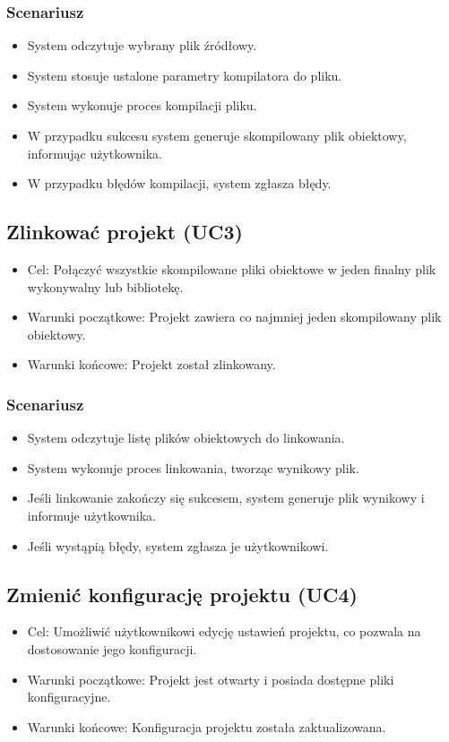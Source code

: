 \subsubsection{Scenariusz}
\begin{itemize}
    \item System odczytuje wybrany plik źródłowy.
    \item System stosuje ustalone parametry kompilatora do pliku.
    \item System wykonuje proces kompilacji pliku.
    \item W przypadku sukcesu system generuje skompilowany plik obiektowy, informując użytkownika.
    \item W przypadku błędów kompilacji, system zgłasza błędy.
\end{itemize}

\subsection{Zlinkować projekt (UC3)}
\begin{itemize}
    \item Cel: Połączyć wszystkie skompilowane pliki obiektowe w jeden finalny plik wykonywalny lub bibliotekę.
    \item Warunki początkowe: Projekt zawiera co najmniej jeden skompilowany plik obiektowy.
    \item Warunki końcowe: Projekt został zlinkowany.
\end{itemize}

\subsubsection{Scenariusz}
\begin{itemize}
    \item System odczytuje listę plików obiektowych do linkowania.
    \item System wykonuje proces linkowania, tworząc wynikowy plik.
    \item Jeśli linkowanie zakończy się sukcesem, system generuje plik wynikowy i informuje użytkownika.
    \item Jeśli wystąpią błędy, system zgłasza je użytkownikowi.
\end{itemize}

\subsection{Zmienić konfigurację projektu (UC4)}
\begin{itemize}
    \item Cel: Umożliwić użytkownikowi edycję ustawień projektu, co pozwala na dostosowanie jego konfiguracji.
    \item Warunki początkowe: Projekt jest otwarty i posiada dostępne pliki konfiguracyjne.
    \item Warunki końcowe: Konfiguracja projektu została zaktualizowana.
\end{itemize}

